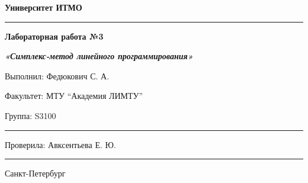 \documentclass[12pt]{article}
\begin{document}
\pagestyle{empty}
\begin{center}
\large{\textbf{Университет ИТМО}}
\end{center}
\rule{525pt}{1pt}
\par\bigskip\par\bigskip\par\bigskip\par\bigskip\par\bigskip\par\bigskip\par\bigskip\par\bigskip
\begin{center}
\Large
\textbf{Лабораторная работа №3}

\textbf{\textit{«Симплекс-метод линейного программирования»}}


\end{center}
\par\bigskip\par\bigskip\par\bigskip\par\bigskip\par\bigskip\par\bigskip\par\bigskip\par\bigskip\par\bigskip\par\bigskip\par\bigskip\par\bigskip\par\bigskip\par\bigskip      
\begin{flushright}
\large
Выполнил: Федюкович С. А.
\par\bigskip
Факультет: МТУ “Академия ЛИМТУ”
\par\bigskip
Группа: S3100                       
\par\bigskip\par\bigskip\par\bigskip

\rule{150pt}{0.5pt}
\par\bigskip\par\bigskip\par\bigskip\par\bigskip                                                            
 Проверила: Авксентьева Е. Ю.
\par\bigskip \par\bigskip

\rule{150pt}{0.5pt}
\end{flushright}
\par\bigskip\par\bigskip\par\bigskip\par\bigskip\par\bigskip\par\bigskip\par\bigskip\par\bigskip\par\bigskip\par\bigskip     
\begin{center}
\large
Санкт-Петербург
\par{}
\end{center}
\newpage
\end{document}
